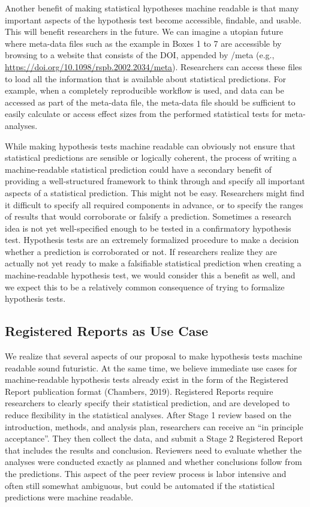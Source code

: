 \documentclass[
  english,
  doc,floatsintext]{apa6}
\begin{document}
Another benefit of making statistical hypotheses machine readable is that many important aspects of the hypothesis test become accessible, findable, and usable. This will benefit researchers in the future. We can imagine a utopian future where meta-data files such as the example in Boxes 1 to 7 are accessible by browsing to a website that consists of the DOI, appended by /meta (e.g., \url{https://doi.org/10.1098/rspb.2002.2034/meta}). Researchers can access these files to load all the information that is available about statistical predictions. For example, when a completely reproducible workflow is used, and data can be accessed as part of the meta-data file, the meta-data file should be sufficient to easily calculate or access effect sizes from the performed statistical tests for meta-analyses.

While making hypothesis tests machine readable can obviously not ensure that statistical predictions are sensible or logically coherent, the process of writing a machine-readable statistical prediction could have a secondary benefit of providing a well-structured framework to think through and specify all important aspects of a statistical prediction. This might not be easy. Researchers might find it difficult to specify all required components in advance, or to specify the ranges of results that would corroborate or falsify a prediction. Sometimes a research idea is not yet well-specified enough to be tested in a confirmatory hypothesis test. Hypothesis tests are an extremely formalized procedure to make a decision whether a prediction is corroborated or not. If researchers realize they are actually not yet ready to make a falsifiable statistical prediction when creating a machine-readable hypothesis test, we would consider this a benefit as well, and we expect this to be a relatively common consequence of trying to formalize hypothesis tests.

\hypertarget{registered-reports-as-use-case}{%
\subsection{Registered Reports as Use Case}\label{registered-reports-as-use-case}}

We realize that several aspects of our proposal to make hypothesis tests machine readable sound futuristic. At the same time, we believe immediate use cases for machine-readable hypothesis tests already exist in the form of the Registered Report publication format (Chambers, 2019). Registered Reports require researchers to clearly specify their statistical prediction, and are developed to reduce flexibility in the statistical analyses. After Stage 1 review based on the introduction, methods, and analysis plan, researchers can receive an \enquote{in principle acceptance}. They then collect the data, and submit a Stage 2 Registered Report that includes the results and conclusion. Reviewers need to evaluate whether the analyses were conducted exactly as planned and whether conclusions follow from the predictions. This aspect of the peer review process is labor intensive and often still somewhat ambiguous, but could be automated if the statistical predictions were machine readable.
\end{document}

